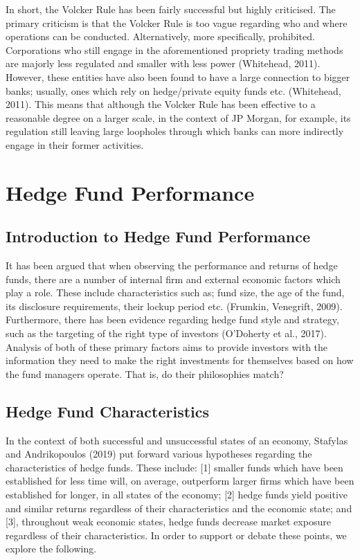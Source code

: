 \documentclass[11pt, english]{article}
\begin{document}
	In short, the Volcker Rule has been fairly successful but highly criticised. The primary criticism is that the Volcker Rule is too vague regarding who and where operations can be conducted. Alternatively, more specifically, prohibited. Corporations who still engage in the aforementioned propriety trading methods are majorly less regulated and smaller with less power (Whitehead, 2011). However, these entities have also been found to have a large connection to bigger banks; usually, ones which rely on hedge/private equity funds etc. (Whitehead, 2011). This means that although the Volcker Rule has been effective to a reasonable degree on a larger scale, in the context of JP Morgan, for example, its regulation still leaving large loopholes through which banks can more indirectly engage in their former activities.

\newpage

\section{Hedge Fund Performance}

	\subsection{Introduction to Hedge Fund Performance}

	It has been argued that when observing the performance and returns of hedge funds, there are a number of internal firm and external economic factors which play a role. These include characteristics such as; fund size, the age of the fund, its disclosure requirements, their lockup period etc. (Frumkin, Venegrift, 2009). Furthermore, there has been evidence regarding hedge fund style and strategy, such as the targeting of the right type of investors (O'Doherty et al., 2017). Analysis of both of these primary factors aims to provide investors with the information they need to make the right investments for themselves based on how the fund managers operate. That is, do their philosophies match?

	\subsection{Hedge Fund Characteristics}

	In the context of both successful and unsuccessful states of an economy, Stafylas and Andrikopoulos (2019) put forward various hypotheses regarding the characteristics of hedge funds. These include: [1] smaller funds which have been established for less time will, on average, outperform larger firms which have been established for longer, in all states of the economy; [2] hedge funds yield positive and similar returns regardless of their characteristics and the economic state; and [3], throughout weak economic states, hedge funds decrease market exposure regardless of their characteristics. In order to support or debate these points, we explore the following.\\
\end{document}
